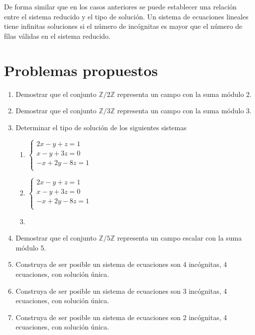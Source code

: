 De forma similar que en los casos anteriores se puede establecer una relación entre el sistema reducido y el tipo de solución. Un sistema de ecuaciones lineales tiene infinitas soluciones si el número de incógnitas es mayor que el número de fílas válidas en el sistema reducido.
\newpage
\section{Problemas propuestos}


\begin{enumerate}[1.]
\item Demostrar que el conjunto $\mathbb{Z}/2\mathbb{Z}$ representa un campo con la suma módulo 2.
\item Demostrar que el conjunto $\mathbb{Z}/3\mathbb{Z}$ representa un campo con la suma módulo 3.
\item Determinar el tipo de solución de los siguientes sistemas

\begin{enumerate}
\item $\left\lbrace \begin{aligned}
2x-y+z=1\\
x-y+3z=0\\
-x+2y-8z=1\\
\end{aligned}\right.$
\item $\left\lbrace \begin{aligned}
2x-y+z=1\\
x-y+3z=0\\
-x+2y-8z=1\\
\end{aligned}\right.$
\item {}

\end{enumerate}
\item Demostrar que el conjunto $\mathbb{Z}/5\mathbb{Z}$ representa un campo escalar con la suma módulo 5.
\item Construya de ser posible un sistema de ecuaciones son 4 incógnitas, 4 ecuaciones, con solución única.
\item Construya de ser posible un sistema de ecuaciones son 3 incógnitas, 4 ecuaciones, con solución única.
\item Construya de ser posible un sistema de ecuaciones son 2 incógnitas, 4 ecuaciones, con solución única.

\end{enumerate}
